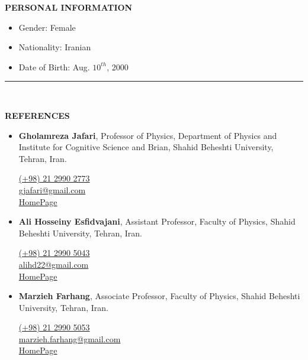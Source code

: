 \documentclass[11pt, b4paper]{cv}
\begin{document}
\textbf{PERSONAL INFORMATION}
\vspace{-0.1in}

\begin{multicols}{3}[\columnsep=0cm]
	\begin{itemize}
	  \item Gender: Female
	  \item Nationality: Iranian
	  \item Date of Birth: Aug. $10^{th}$, 2000
	\end{itemize}
\end{multicols}

\vspace{-0.15in}
\rule{\textwidth}{1pt}\\
\vspace{-0.15in}

\textbf{REFERENCES}
\vspace{-0.1in}

\begin{itemize}
	\item \textbf{Gholamreza Jafari}, Professor of Physics, Department of Physics and Institute for Cognitive Science and Brian, Shahid Beheshti University, Tehran, Iran.
	
	\href{tel:(+98)2129902773}{ (+98) 21 2990 2773}\\
	\href{mailto:gjafari@gmail.com}{ gjafari@gmail.com}\\
	\href{https://complexity.sbu.ac.ir/professor-reza-jafari/}{HomePage} 
	\item \textbf{Ali Hosseiny Esfidvajani}, Assistant Professor, Faculty of Physics, Shahid Beheshti University, Tehran, Iran.
	
	\href{tel:(+98)2129905043}{ (+98) 21 2990 5043}\\
	\href{mailto:alihd22@gmail.com}{ alihd22@gmail.com}\\
	\href{https://alihosseiny.com/}{HomePage} 
		
	\item \textbf{Marzieh Farhang}, Associate Professor, Faculty of Physics, Shahid Beheshti University, Tehran, Iran.
	
	\href{tel:(+98)2129905053}{ (+98) 21 2990 5053}\\
	\href{mailto:marzieh.farhang@gmail.com}{ marzieh.farhang@gmail.com}\\
	\href{https://en.sbu.ac.ir/~m_farhang/home}{HomePage} 
\end{itemize}
\end{document}
